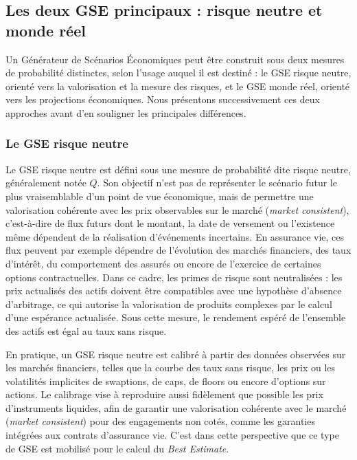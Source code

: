 \subsection{Les deux GSE principaux : risque neutre et monde réel}

Un Générateur de Scénarios Économiques peut être construit sous deux mesures de probabilité distinctes, selon l'usage auquel il est destiné : le GSE risque neutre, orienté vers la valorisation et la mesure des risques, et le GSE monde réel, orienté vers les projections économiques. Nous présentons successivement ces deux approches avant d'en souligner les principales différences.

\subsubsection{Le GSE risque neutre}

Le GSE risque neutre est défini sous une mesure de probabilité dite risque neutre, généralement notée $Q$. Son objectif n'est pas de représenter le scénario futur le plus vraisemblable d'un point de vue économique, mais de permettre une valorisation cohérente avec les prix observables sur le marché (\textit{market consistent}), c'est-à-dire de flux futurs dont le montant, la date de versement ou l'existence même dépendent de la réalisation d'événements incertains. En assurance vie, ces flux peuvent par exemple dépendre de l'évolution des marchés financiers, des taux d'intérêt, du comportement des assurés ou encore de l'exercice de certaines options contractuelles. Dans ce cadre, les primes de risque sont neutralisées : les prix actualisés des actifs doivent être compatibles avec une hypothèse d'absence d'arbitrage, ce qui autorise la valorisation de produits complexes par le calcul d'une espérance actualisée. Sous cette mesure, le rendement espéré de l'ensemble des actifs est égal au taux sans risque.

En pratique, un GSE risque neutre est calibré à partir des données observées sur les marchés financiers, telles que la courbe des taux sans risque, les prix ou les volatilités implicites de swaptions, de caps, de floors ou encore d'options sur actions. Le calibrage vise à reproduire aussi fidèlement que possible les prix d'instruments liquides, afin de garantir une valorisation cohérente avec le marché (\textit{market consistent}) pour des engagements non cotés, comme les garanties intégrées aux contrats d'assurance vie. C'est dans cette perspective que ce type de GSE est mobilisé pour le calcul du \textit{Best Estimate}.


